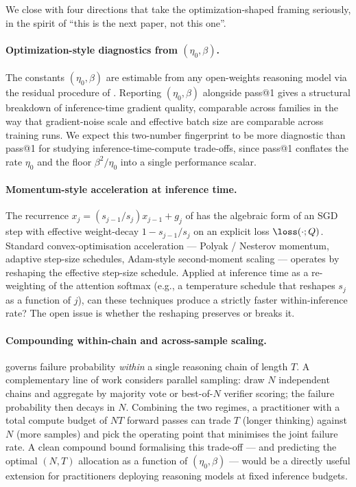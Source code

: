 We close with four directions that take the optimization-shaped framing
seriously, in the spirit of ``this is the next paper, not this one''.

\paragraph{Optimization-style diagnostics from $(\eta_0, \beta)$.}
The constants $(\eta_0, \beta)$ are estimable from any open-weights
reasoning model via the residual procedure of .
Reporting $(\eta_0, \beta)$ alongside pass@1 gives a structural
breakdown of inference-time gradient quality, comparable across
families in the way that gradient-noise scale and effective batch size
are comparable across training runs. We expect this two-number
fingerprint to be more diagnostic than pass@1 for studying
inference-time-compute trade-offs, since pass@1 conflates the rate
$\eta_0$ and the floor $\beta^2/\eta_0$ into a single performance scalar.

\paragraph{Momentum-style acceleration at inference time.}
The recurrence $x_j = (s_{j-1}/s_j) x_{j-1} + g_j$ of
 has the algebraic form of an SGD
step with effective weight-decay $1 - s_{j-1}/s_j$ on an explicit loss
$\loss(\cdot; Q)$. Standard convex-optimisation acceleration --- Polyak /
Nesterov momentum, adaptive step-size schedules, Adam-style second-moment
scaling --- operates by reshaping the effective step-size schedule.
Applied at inference time as a re-weighting of the attention softmax
(e.g., a temperature schedule that reshapes $s_j$ as a function of $j$),
can these techniques produce a strictly faster within-inference rate?
The open issue is whether the reshaping preserves
 or breaks it.

\paragraph{Compounding within-chain and across-sample scaling.}
 governs failure probability
\emph{within} a single reasoning chain of length $T$. A complementary
line of work considers parallel sampling: draw $N$ independent chains
and aggregate by majority vote or best-of-$N$ verifier scoring; the
failure probability then decays in $N$. Combining the two regimes, a
practitioner with a total compute budget of $N T$ forward passes can
trade $T$ (longer thinking) against $N$ (more samples) and pick the
operating point that minimises the joint failure rate. A clean compound
bound formalising this trade-off --- and predicting the optimal $(N, T)$
allocation as a function of $(\eta_0, \beta)$ --- would be a directly
useful extension for practitioners deploying reasoning models at fixed
inference budgets.

